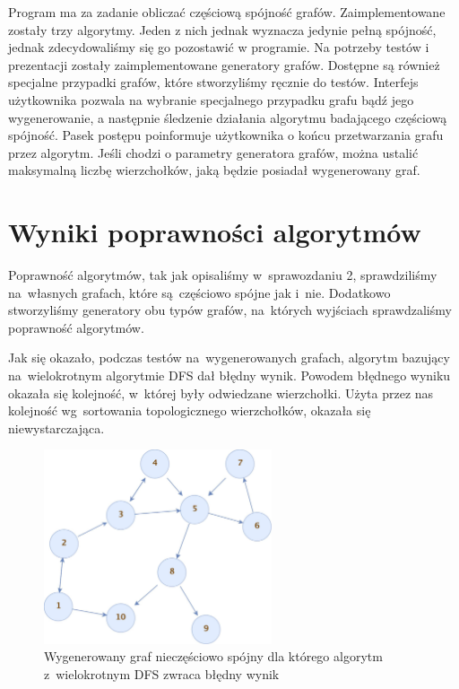 \documentclass[a4paper,12pt]{mwart}
\begin{document}
Program ma za zadanie obliczać częściową spójność grafów. Zaimplementowane
zostały trzy algorytmy. Jeden z nich jednak wyznacza jedynie pełną spójność,
jednak zdecydowaliśmy się go pozostawić w programie. Na potrzeby testów i
prezentacji zostały zaimplementowane generatory grafów. Dostępne są również
specjalne przypadki grafów, które stworzyliśmy ręcznie do testów. Interfejs
użytkownika pozwala na wybranie specjalnego przypadku grafu bądź jego
wygenerowanie, a
następnie śledzenie działania algorytmu badającego częściową spójność. Pasek
postępu poinformuje użytkownika o końcu przetwarzania grafu przez algorytm.
Jeśli chodzi o parametry generatora grafów, można ustalić maksymalną liczbę
wierzchołków, jaką będzie posiadał wygenerowany graf.

\section{Wyniki poprawności algorytmów}

Poprawność algorytmów, tak jak opisaliśmy w~sprawozdaniu 2, sprawdziliśmy
na~własnych grafach, które są~częściowo spójne jak i~nie. Dodatkowo
stworzyliśmy generatory obu typów grafów, na~których wyjściach sprawdzaliśmy
poprawność algorytmów.

Jak się okazało, podczas testów na~wygenerowanych grafach, algorytm bazujący
na~wielokrotnym algorytmie DFS dał błędny wynik. Powodem błędnego wyniku
okazała się kolejność, w~której były odwiedzane wierzchołki. Użyta przez nas
kolejność wg~sortowania topologicznego wierzchołków, okazała się
niewystarczająca.

\begin{figure}[htpb]
\centering
\includegraphics[width=0.6\textwidth]{generated-tricky-graph.jpg}
\caption{Wygenerowany graf nieczęściowo spójny dla którego algorytm
  z~wielokrotnym DFS zwraca błędny wynik}
\label{fig:tricky-graph}
\end{figure}
\end{document}
